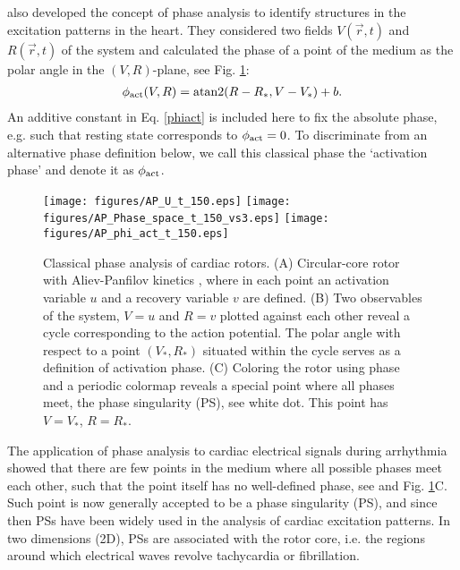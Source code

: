 \documentclass{article}
\newcommand{\phiact}{\ensuremath{\phi_{\rm act}}}
\newcommand{\VS}{V_*}
\newcommand{\RS}{R_*}
\begin{document}
\cite{Gray:1998} also developed the concept of phase analysis to identify structures in the excitation patterns in the heart. They considered two fields $V(\vec{r},t)$ and $R(\vec{r},t)$ of the system and calculated the phase of a point of the medium as the polar angle in the $(V,R)$-plane, see Fig. \ref{fig:classic}:
\begin{align}
   \phiact(V,R) = \mathrm{atan2}( R-\RS, V-\VS) + b.  \label{phiact}
\end{align}
An additive constant in Eq. \eqref{phiact} is included here to fix the absolute phase, e.g. such that resting state corresponds to $\phiact =0$. To discriminate from an alternative phase definition below, we call this classical phase the `activation phase' and denote it as $\phiact$. 
\begin{figure}
    \centering
    \texttt{[image: figures/AP\_U\_t\_150.eps]}
    \texttt{[image: figures/AP\_Phase\_space\_t\_150\_vs3.eps]}
      \texttt{[image: figures/AP\_phi\_act\_t\_150.eps]} \\
    \caption{Classical phase analysis of cardiac rotors. (A) Circular-core rotor with Aliev-Panfilov kinetics \citep{Aliev:1996}, where in each point an activation variable $u$ and a recovery variable $v$ are defined. (B) Two observables of the system, $V=u$ and $R=v$ plotted against each other reveal a cycle corresponding to the action potential. The polar angle with respect to a point $(\VS, \RS)$ situated within the cycle serves as a definition of activation phase. (C) Coloring the rotor using phase and a periodic colormap reveals a special point where all phases meet, the phase singularity (PS), see white dot. This point has $V=\VS$, $R=\RS$. }
    \label{fig:classic}
\end{figure}

The application of phase analysis to cardiac electrical signals during arrhythmia showed that there are few points in the medium where all possible phases meet each other, such that the point itself has no well-defined phase, see \citep{Gray:1998} and Fig. \ref{fig:classic}C. Such point is now generally accepted to be a phase singularity (PS), and since then PSs have been widely used in the analysis of cardiac excitation patterns. 
In two dimensions (2D), PSs are associated with the rotor core, i.e. the regions around which electrical waves revolve tachycardia or fibrillation. 
\end{document}
